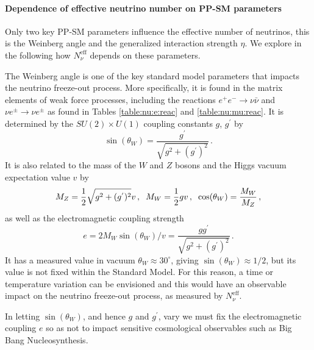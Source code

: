 \paragraph{Dependence of effective neutrino number on PP-SM parameters}

Only two key PP-SM parameters  influence the effective number of neutrinos, this is the Weinberg angle and the generalized interaction strength $\eta$. We explore in the following how  $N_\nu^{\mathrm{eff}}$ depends on these parameters.

The Weinberg angle is one of the key standard model parameters that impacts the neutrino freeze-out process.  More specifically, it is found in the matrix elements of weak force processes, including the reactions $e^+e^-\rightarrow \nu\bar\nu$ and $\nu e^\pm\rightarrow \nu e^\pm$ as found in Tables \ref{table:nu:e:reac} and \ref{table:nu:mu:reac}.  It is determined by the $SU(2)\times U(1)$ coupling constants $g$, $g^{'}$  by
\begin{equation}
\sin(\theta_W)=\frac{g^{'}}{\sqrt{g^2+(g^{'})^2}}\,.
\end{equation}
It is also related to the mass of the $W$ and $Z$ bosons and the Higgs vacuum expectation value $v$ by
\begin{equation}
M_Z=\frac{1}{2}\sqrt{g^2+(g^{'})^2}v\,,\hspace{2mm}  M_W=\frac{1}{2}gv\,,\hspace{2mm} \cos(\theta_W)=\frac{M_W}{M_Z}\,,
\end{equation}
as well as the electromagnetic coupling strength
\begin{equation}
e=2M_W\sin(\theta_W)/v=\frac{gg^{'}}{\sqrt{g^2+(g^{'})^2}}\,.
\end{equation}
It has a measured value in vacuum $\theta_W\approx 30^\circ$, giving $\sin(\theta_W)\approx 1/2$, but its value is not fixed within the Standard Model. For this reason, a time or temperature variation can be envisioned and this would have an observable impact on the neutrino freeze-out process, as measured by $N_\nu^{\mathrm{eff}}$.

In letting $\sin(\theta_W)$, and hence $g$ and $g^{'}$, vary we must fix the electromagnetic coupling $e$ so as not to impact sensitive cosmological observables such as Big Bang Nucleosynthesis.  

